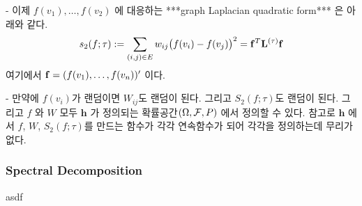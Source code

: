 \documentclass[preprint, review, 12pt]{article}
\theoremstyle{definition}
\theoremstyle{remark}
\begin{document}
- 이제 $f(v_1),\dots,f(v_2)$ 에 대응하는 ***graph Laplacian quadratic form*** 은 아래와 같다. 
\begin{align}
s_2(f;\tau):=\sum_{(i,j)\in E} w_{ij} \big(f(v_i)-f(v_j)\big)^2={\bf f}^T {\bf L}^{(\tau)}{\bf f}
\end{align}
여기에서 ${\bf f}=(f(v_1),\dots,f(v_n))'$ 이다. 

- 만약에 $f(v_i)$가 랜덤이면 $W_{ij}$도 랜덤이 된다. 그리고 $S_2(f;\tau)$도 랜덤이 된다. 그리고 $f$ 와 $W$ 모두 ${\boldsymbol h}$ 가 정의되는 확률공간$(\Omega,{\cal F},P)$ 에서 정의할 수 있다. 참고로 ${\boldsymbol h}$ 에서 $f$, $W$, $S_2(f;\tau)$를 만드는 함수가 각각 연속함수가 되어 각각을 정의하는데 무리가 없다. 

\subsubsection*{Spectral Decomposition}
asdf
\end{document}

